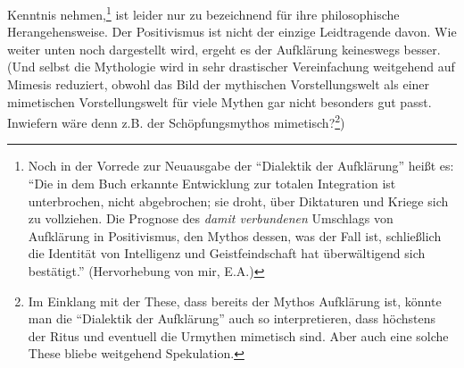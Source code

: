 \documentclass[12pt,a4paper,ngerman]{article}
\begin{document}
Kenntnis nehmen,\footnote{Noch in der Vorrede zur Neuausgabe der
  "`Dialektik der Aufklärung"' heißt es: "`Die in dem Buch erkannte
  Entwicklung zur totalen Integration ist unterbrochen, nicht
  abgebrochen; sie droht, über Diktaturen und Kriege sich zu
  vollziehen. Die Prognose des {\em damit verbundenen} Umschlags von
  Aufklärung in Positivismus, den Mythos dessen, was der Fall ist,
  schließlich die Identität von Intelligenz und Geistfeindschaft hat
  überwältigend sich bestätigt."'  \cite[S.
  IX/X]{adorno-horkheimer:1947} (Hervorhebung von mir, E.A.)} ist
leider nur zu bezeichnend für ihre philosophische Herangehensweise.
Der Positivismus ist nicht der einzige Leidtragende davon. Wie weiter
unten noch dargestellt wird, ergeht es der Aufklärung keineswegs
besser. (Und selbst die Mythologie wird in sehr drastischer
Vereinfachung weitgehend auf Mimesis reduziert, obwohl das Bild der
mythischen Vorstellungswelt als einer mimetischen Vorstellungswelt für
viele Mythen gar nicht besonders gut passt. Inwiefern wäre denn z.B.
der Schöpfungsmythos mimetisch?\footnote{Im Einklang mit der These,
  dass bereits der Mythos Aufklärung ist, könnte man die "`Dialektik
  der Aufklärung"' auch so interpretieren, dass höchstens der Ritus
  und eventuell die Urmythen mimetisch sind. Aber auch eine solche
  These bliebe weitgehend Spekulation.})
\end{document}
